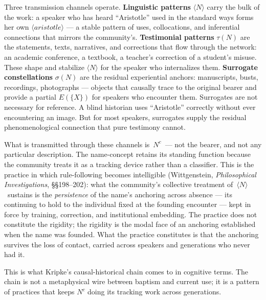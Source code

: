 \documentclass[12pt,a4paper]{article}
\begin{document}
Three transmission channels operate. \textbf{Linguistic patterns} \(\langle N \rangle\) carry the bulk of the work: a speaker who has heard ``Aristotle'' used in the standard ways forms her own \(\langle aristotle \rangle\) --- a stable pattern of uses, collocations, and inferential connections that mirrors the community's. \textbf{Testimonial patterns} \(\tau(N)\) are the statements, texts, narratives, and corrections that flow through the network: an academic conference, a textbook, a teacher's correction of a student's misuse. These shape and stabilize \(\langle N \rangle\) for the speaker who internalizes them. \textbf{Surrogate constellations} \(\sigma(N)\) are the residual experiential anchors: manuscripts, busts, recordings, photographs --- objects that causally trace to the original bearer and provide a partial \(E(\{X\})\) for speakers who encounter them. Surrogates are not necessary for reference. A blind historian uses ``Aristotle'' correctly without ever encountering an image. But for most speakers, surrogates supply the residual phenomenological connection that pure testimony cannot.

What is transmitted through these channels is~\(N^c\)~--- not the bearer, and not any particular description. The name-concept retains its standing function because the community treats it as a tracking device rather than a classifier. This is the practice in which rule-following becomes intelligible (Wittgenstein, \emph{Philosophical Investigations}, §§198--202): what the community's collective treatment of~\(\langle N \rangle\)~sustains is the \emph{persistence} of the name's anchoring across absence --- its continuing to hold to the individual fixed at the founding encounter --- kept in force by training, correction, and institutional embedding. The practice does not constitute the rigidity; the rigidity is the modal face of an anchoring established when the name was founded. What the practice constitutes is that the anchoring survives the loss of contact, carried across speakers and generations who never had it.

This is what Kripke's causal-historical chain comes to in cognitive terms. The chain is not a metaphysical wire between baptism and current use; it is a pattern of practices that keeps \(N^c\) doing its tracking work across generations.
\end{document}

